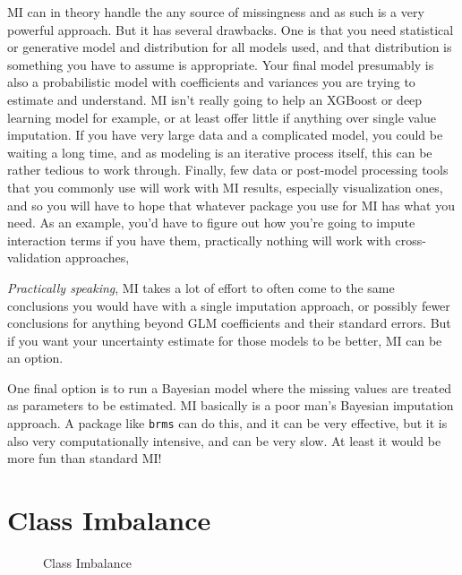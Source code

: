 \documentclass[
  letterpaper,
]{krantz}
\begin{document}
MI can in theory handle the any source of missingness and as such is a
very powerful approach. But it has several drawbacks. One is that you
need statistical or generative model and distribution for all models
used, and that distribution is something you have to assume is
appropriate. Your final model presumably is also a probabilistic model
with coefficients and variances you are trying to estimate and
understand. MI isn't really going to help an XGBoost or deep learning
model for example, or at least offer little if anything over single
value imputation. If you have very large data and a complicated model,
you could be waiting a long time, and as modeling is an iterative
process itself, this can be rather tedious to work through. Finally, few
data or post-model processing tools that you commonly use will work with
MI results, especially visualization ones, and so you will have to hope
that whatever package you use for MI has what you need. As an example,
you'd have to figure out how you're going to impute interaction terms if
you have them, practically nothing will work with cross-validation
approaches,

\emph{Practically speaking}, MI takes a lot of effort to often come to
the same conclusions you would have with a single imputation approach,
or possibly fewer conclusions for anything beyond GLM coefficients and
their standard errors. But if you want your uncertainty estimate for
those models to be better, MI can be an option.

One final option is to run a Bayesian model where the missing values are
treated as parameters to be estimated. MI basically is a poor man's
Bayesian imputation approach. A package like \texttt{brms} can do this,
and it can be very effective, but it is also very computationally
intensive, and can be very slow. At least it would be more fun than
standard MI!

\section{Class Imbalance}\label{sec-class-imbalance}

\begin{figure}[H]


\caption{\label{fig-class-imbalance}Class Imbalance}

\end{figure}%
\end{document}
